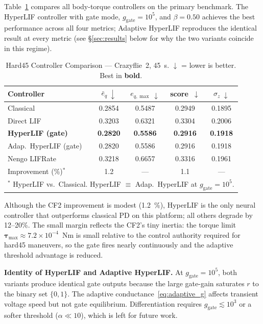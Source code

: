 \documentclass[conference]{IEEEtran}
\begin{document}
Table~\ref{tab:hard45} compares all body-torque controllers on the primary
benchmark.
The HyperLIF controller with gate mode, $g_{\mathrm{gate}} = 10^5$,
and $\beta = 0.50$ achieves the best performance across all four metrics;
Adaptive HyperLIF reproduces the identical result at every metric (see
\S\ref{sec:results} below for why the two variants coincide in this regime).

\begin{table}[t]
  \centering
  \caption{Hard45 Controller Comparison --- Crazyflie~2, \SI{45}{\second}.
    $\downarrow$ = lower is better. Best in \textbf{bold}.}
  \label{tab:hard45}
  \setlength{\tabcolsep}{4pt}
  \begin{tabular}{lcccc}
    \toprule
    Controller &
    $\bar{e}_q~\downarrow$ &
    $e_{q,\max}~\downarrow$ &
    score~$\downarrow$ &
    $\sigma_z~\downarrow$ \\
    \midrule
    Classical              & 0.2854 & 0.5487 & 0.2949 & 0.1895 \\
    Direct LIF             & 0.3203 & 0.6321 & 0.3304 & 0.2006 \\
    \textbf{HyperLIF (gate)} & \textbf{0.2820} & \textbf{0.5586}
                           & \textbf{0.2916} & \textbf{0.1918} \\
    Adap.\ HyperLIF (gate) & 0.2820 & 0.5586 & 0.2916 & 0.1918 \\
    Nengo LIFRate          & 0.3218 & 0.6657 & 0.3316 & 0.1961 \\
    \midrule
    Improvement (\%)$^*$   & 1.2 & --- & 1.1 & --- \\
    \bottomrule
    \multicolumn{5}{l}{\footnotesize $^*$ HyperLIF vs.\ Classical. HyperLIF $\equiv$ Adap.\ HyperLIF at $g_{\mathrm{gate}}{=}10^5$.}
  \end{tabular}
\end{table}

Although the CF2 improvement is modest (\SI{1.2}{\percent}), HyperLIF is the
only neural controller that outperforms classical PD on this platform; all
others degrade by 12--20\%.
The small margin reflects the CF2's tiny inertia: the torque limit
$\boldsymbol{\tau}_{\max} \approx 7.2 \times 10^{-4}$~Nm is small relative to the
control authority required for hard45 maneuvers, so the gate fires nearly
continuously and the adaptive threshold advantage is reduced.

\noindent\textbf{Identity of HyperLIF and Adaptive HyperLIF.}
At $g_{\mathrm{gate}} = 10^5$, both variants produce identical gate outputs
because the large gate-gain saturates $r$ to the binary set $\{0, 1\}$.
The adaptive conductance~\eqref{eq:adaptive_g} affects transient voltage
speed but not gate equilibrium.
Differentiation requires $g_{\mathrm{gate}} \lesssim 10^3$ or a softer
threshold ($\alpha \ll 10$), which is left for future work.
\end{document}
